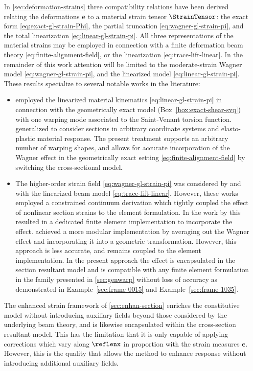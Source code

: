 In \cref{sec:deformation-strains} three compatibility relations have been derived relating the deformations \(\bm{e}\) to a material strain tensor \(\StrainTensor\): the exact form \eqref{eq:exact-gl-strain-Phi}, the partial truncation \eqref{eq:wagner-gl-strain-pi}, and the total linearization \eqref{eq:linear-gl-strain-pi}. 
All three representations of the material strains may be employed in connection with a finite deformation beam theory \eqref{eq:finite-alignment-field}, or the linearization \eqref{eq:trace-lift-linear}. 
In the remainder of this work attention will be limited to the moderate-strain Wagner model \eqref{eq:wagner-gl-strain-pi}, and the linearized model \eqref{eq:linear-gl-strain-pi}.
These results specialize to several notable works in the literature:
\begin{itemize}
    \item \cite{simo1991geometricallyexact} employed the linearized material kinematics \eqref{eq:linear-gl-strain-pi} in connection with the geometrically exact model (Box~\ref{box:exact-shear-svq}) with one warping mode associated to the Saint-Venant torsion function. \cite{gruttmann2000theory} generalized \cite{simo1991geometricallyexact} to consider sections in arbitrary coordinate systems and elasto-plastic material response. 
    The present treatment supports an arbitrary number of warping shapes, and allows for accurate incorporation of the Wagner effect in the geometrically exact setting \eqref{eq:finite-alignment-field} by switching the cross-sectional model. 
    \item The higher-order strain field \eqref{eq:wagner-gl-strain-pi} was considered by \cite{battini2002corotational-thesis} and \cite{lecorvec2012nonlinear} with the linearized beam model \eqref{eq:trace-lift-linear}. 
    However, these works employed a constrained continuum derivation which tightly coupled the effect of nonlinear section strains to the element formulation. In the work by \cite{battini2002corotational-thesis} this resulted in a dedicated finite element implementation to incorporate the effect. \cite{lecorvec2012nonlinear} achieved a more modular implementation by averaging out the Wagner effect and incorporating it into a geometric transformation. However, this approach is less accurate, and remains coupled to the element implementation.
    In the present approach the effect is encapsulated in the section resultant model and is compatible with any finite element formulation in the family presented in \cref{sec:genwarp} without loss of accuracy as demonstrated in Example~\ref{sec:frame-0015} and Example~\ref{sec:frame-1035}.
\end{itemize}

The enhanced strain framework of \cref{sec:enhan-section} enriches the constitutive model without introducing auxiliary fields beyond those considered by the underlying beam theory, and is likewise encapsulated within the cross-section resultant model. 
This has the limitation that it is only capable of applying corrections which vary along \(\reflenx\) in proportion with the strain measures \(\bm{e}\). 
However, this is the quality that allows the method to enhance response without introducing additional auxiliary fields.
